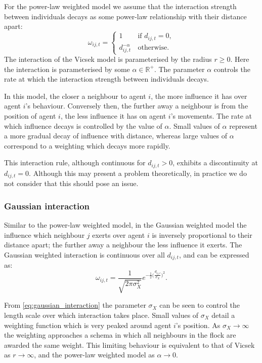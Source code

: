 For the power-law weighted model we assume that the interaction strength between
individuals decays as some power-law relationship with their distance apart:
\begin{equation}
    \label{eq:power_law_interaction}
	\omega_{ij,t} =
	\begin{cases}
		1                  & \, \text{if } d_{ij,t} = 0, \\
		d_{ij,t}^{-\alpha} & \, \text{otherwise}.
	\end{cases}
\end{equation}
The interaction of the Vicsek model is parameterised by the radius $r \geq 0$. Here the
interaction is parameterised by some $\alpha\in\mathbb{R}^+$. The parameter $\alpha$
controls the rate at which the interaction strength between individuals decays. 

In this model, the closer a neighbour to agent $i$, the more influence it has over agent
$i$'s behaviour. Conversely then, the further away a neighbour is from the position of
agent $i$, the less influence it has on agent $i$'s movements. The rate at which influence
decays is controlled by the value of $\alpha$. Small values of $\alpha$ represent a more
gradual decay of influence with distance, whereas large values of $\alpha$ correspond to a
weighting which decays more rapidly.

This interaction rule, although continuous for $d_{ij,t} > 0$, exhibits a discontinuity at
$d_{ij,t}=0$. Although this may present a problem theoretically, in practice we do not
consider that this should pose an issue.

\subsubsection{Gaussian interaction}

Similar to the power-law weighted model, in the Gaussian weighted model the influence
which neighbour $j$ exerts over agent $i$ is inversely proportional to their distance
apart; the further away a neighbour the less influence it exerts. The Gaussian weighted
interaction is continuous over all $d_{ij,t}$, and can be expressed as:
\begin{equation}
    \label{eq:gaussian_interaction}
	\omega_{ij,t} =
	\frac{1}{\sqrt{2\pi\sigma_X^2}}
	e^{-\frac{1}{2}\big(\frac{d_{ij,t}}{\sigma_X}\big)^2}.
\end{equation}

From \cref{eq:gaussian_interaction} the parameter $\sigma_X$ can be seen to control the
length scale over which interaction takes place. Small values of $\sigma_X$ detail a
weighting function which is very peaked around agent $i$'s position. As $\sigma_X
\rightarrow \infty$ the weighting approaches a schema in which all neighbours in the flock
are awarded the same weight. This limiting behaviour is equivalent to that of Vicsek as
$r\rightarrow\infty$, and the power-law weighted model as $\alpha\rightarrow0$.

